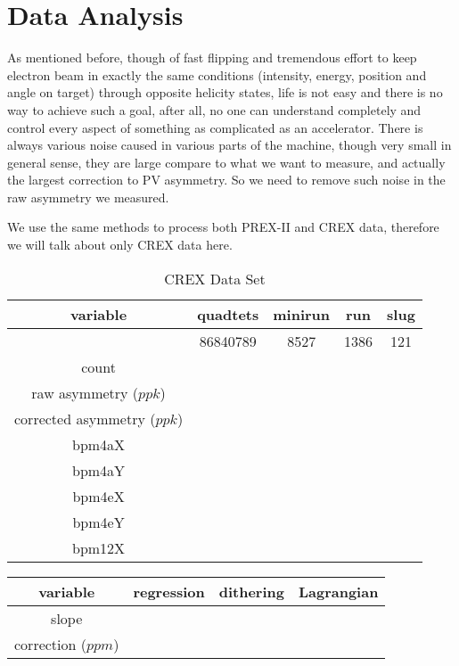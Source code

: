\chapter{Data Analysis}
As mentioned before, though of fast flipping and tremendous effort to keep electron beam in exactly
the same conditions (intensity, energy, position and angle on target) through 
opposite helicity states, life is not easy and there is no way to achieve such
a goal, after all, no one can understand completely and control every aspect of
something as complicated as an accelerator. There is always various noise caused
in various parts of the machine, though very small in general sense, they are
large compare to what we want to measure, and actually the largest correction
to PV asymmetry. So we need to remove such noise in the raw asymmetry we measured.

We use the same methods to process both PREX-II and CREX data, therefore we will
talk about only CREX data here.

\begin{table}
    \centering
    \begin{tabular}{c | c c c c }
	\hline
	variable    & quadtets    & minirun	& run	& slug	\\
	\hline	    & 86840789	& 8527	& 1386 & 121 \\
	count	    &	&   &	&   \\
	raw asymmetry ($ppk$)	&   \\
	corrected asymmetry ($ppk$)	&   \\
	\hline
	bpm4aX	\\
	bpm4aY	\\
	bpm4eX	\\
	bpm4eY	\\
	bpm12X	\\
	\hline
    \end{tabular}
    \caption{CREX Data Set}
\end{table}

\begin{table}
    \begin{tabular}{c | c c c}
	\hline
	variable    & regression    & dithering	    & Lagrangian    \\
	\hline
	slope	\\
	correction ($ppm$)  \\
	\hline
    \end{tabular}
\end{table}

